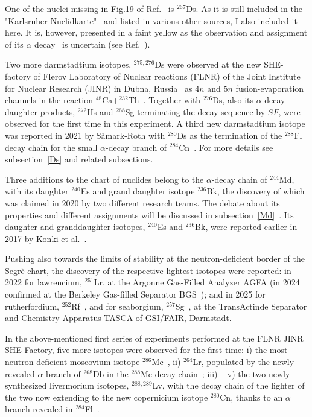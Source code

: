 One of the nuclei missing in Fig.19 of Ref.~\cite{Ackermann2017} is $^{267}$Ds.
As it is still included in the "Karlsruher Nuclidkarte"~\cite{Soti2024} and listed in various other sources, I also included it here. It is, however, presented in a faint yellow as the observation and assignment of its $\alpha$ decay~\cite{Ghiorso1995} is uncertain (see Ref.~\cite{Karol2001}). 

Two more darmstadtium isotopes, $^{275,276}$Ds were observed at the new SHE-factory of Flerov Laboratory of Nuclear reactions (FLNR) of the Joint Institute for Nuclear Research (JINR) in Dubna, Russia~\cite{Gulbekian2019} as 4$n$ and 5$n$ fusion-evaporation channels in the reaction $^{48}$Ca+$^{232}$Th~\cite{Oganessian2023,Oganessian2024}.
Together with $^{276}$Ds, also its $\alpha$-decay daughter products, $^{272}$Hs and $^{268}$Sg terminating the decay sequence by $SF$, were observed for the first time in this experiment.
A third new darmstadtium isotope was reported in 2021 by S{\aa}mark-Roth with $^{280}$Ds as the termination of the $^{288}$Fl decay chain for the small $\alpha$-decay branch of $^{284}$Cn~\cite{Samark-Roth2021}. 
For more details see subsection~\ref{Ds} and related subsections.

Three additions to the chart of nuclides belong to the $\alpha$-decay chain of $^{244}$Md, with its daughter $^{240}$Es and grand daughter isotope $^{236}$Bk, the discovery of which was claimed in 2020 by two different research teams. 
The debate about its properties and different assignments will be discussed in subsection~\ref{Md}~\cite{Pore2020,Khuyagbaatar2020,Hessberger2021}. 
Its daughter and granddaughter isotopes, $^{240}$Es and $^{236}$Bk, were reported earlier in 2017 by Konki et al.~\cite{Konki2017}.

Pushing also towards the limits of stability at the neutron-deficient border of the Segr\`{e} chart, the discovery of the respective lightest isotopes were reported: in 2022 for lawrencium, $^{251}$Lr, at the Argonne Gas-Filled Analyzer AGFA (in 2024 confirmed at the Berkeley Gas-filled Separator BGS~\cite{Pore2024a}); and in 2025 for rutherfordium, $^{252}$Rf~\cite{Khuyagbaatar2025}, and for seaborgium, $^{257}$Sg~\cite{Mosat2025}, at the TransActinde Separator and
Chemistry Apparatus TASCA of GSI/FAIR, Darmstadt.

In the above-mentioned first series of experiments performed at the FLNR JINR SHE Factory, five more isotopes were observed for the first time: i) the most neutron-deficient moscovium isotope $^{286}$Mc~\cite{Oganessian2022d}, ii) $^{264}$Lr, populated by the newly revealed $\alpha$ branch of $^{268}$Db in the $^{288}$Mc decay chain~\cite{Oganessian2022c,Oganessian2022d}; iii) -- v) the two newly synthesized livermorium isotopes, $^{288,289}$Lv, with the decay chain of the lighter of the two now extending to the new copernicium isotope $^{280}$Cn, thanks to an $\alpha$ branch revealed in $^{284}$Fl~\cite{Oganessian2025}.

